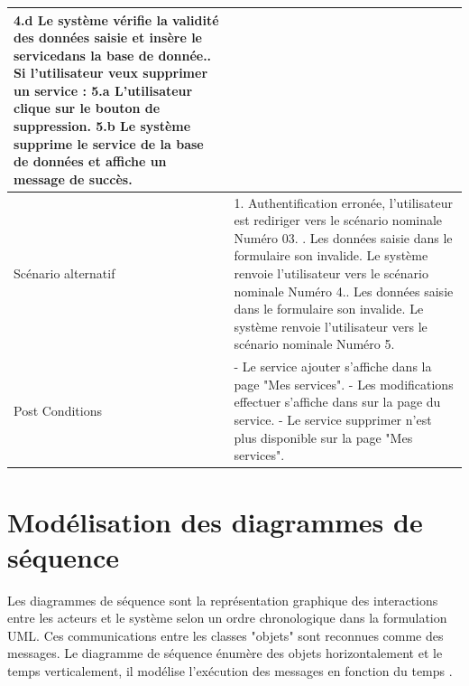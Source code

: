 \documentclass[french]{report}
\begin{document}
\begin{description}
\begin{minipage}{\linewidth}
\begin{tabular}{|m{3cm}|m{9cm}|}
                    4.d Le système vérifie la validité des données saisie et insère le service\newline dans la base de donnée.\newline
                5. Si l'utilisateur veux supprimer un service : \newline
                    5.a L'utilisateur clique sur le bouton de suppression.\newline
                    5.b Le système supprime le service de la base de données et affiche un message de succès.\newline
                \\ 
            \hline
            Scénario alternatif &   
                1. Authentification erronée, l'utilisateur est rediriger vers
		le scénario nominale Numéro 03. \newline
                4.  Les données saisie dans le formulaire son invalide.
		Le système renvoie l'utilisateur vers le scénario nominale Numéro 4.\newline
                5.  Les données saisie dans le formulaire son invalide. 
		Le système renvoie l'utilisateur vers le scénario nominale Numéro 5.\newline
                
                
            \\ 
            \hline
            Post Conditions & 
                - Le service ajouter s'affiche dans la page "Mes services".\newline
                - Les modifications effectuer s'affiche dans sur la page du service.\newline
                - Le service supprimer n'est plus disponible sur la page "Mes services".  \newline
            \\
            \hline
            \end{tabular}
        \end{minipage}
    \end{description}

\section{Modélisation des diagrammes de séquence}

Les diagrammes de séquence sont la représentation graphique des interactions entre 
les acteurs et le système selon un ordre chronologique dans la formulation UML.
Ces communications entre les classes "objets" sont reconnues comme des messages.
Le diagramme de séquence énumère des objets horizontalement et le temps verticalement,
il modélise l'exécution des messages en fonction du temps \cite{UML3}.
\end{document}

